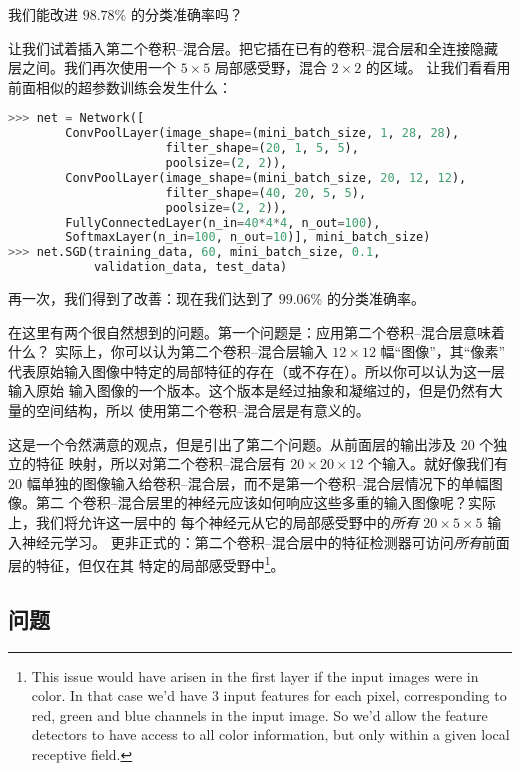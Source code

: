 我们能改进 $98.78$\% 的分类准确率吗？

让我们试着插入第二个卷积--混合层。把它插在已有的卷积--混合层和全连接隐藏
层之间。我们再次使用一个 $5 \times 5$ 局部感受野，混合 $2 \times 2$ 的区域。
让我们看看用前面相似的超参数训练会发生什么：
\begin{lstlisting}[language=Python]
>>> net = Network([
        ConvPoolLayer(image_shape=(mini_batch_size, 1, 28, 28), 
                      filter_shape=(20, 1, 5, 5), 
                      poolsize=(2, 2)),
        ConvPoolLayer(image_shape=(mini_batch_size, 20, 12, 12), 
                      filter_shape=(40, 20, 5, 5), 
                      poolsize=(2, 2)),
        FullyConnectedLayer(n_in=40*4*4, n_out=100),
        SoftmaxLayer(n_in=100, n_out=10)], mini_batch_size)
>>> net.SGD(training_data, 60, mini_batch_size, 0.1, 
            validation_data, test_data)        
\end{lstlisting}

再一次，我们得到了改善：现在我们达到了 $99.06$\% 的分类准确率。

在这里有两个很自然想到的问题。第一个问题是：应用第二个卷积--混合层意味着什么？
实际上，你可以认为第二个卷积--混合层输入 $12 \times 12$ 幅“图像”，其“像素”
代表原始输入图像中特定的局部特征的存在（或不存在）。所以你可以认为这一层输入原始
输入图像的一个版本。这个版本是经过抽象和凝缩过的，但是仍然有大量的空间结构，所以
使用第二个卷积--混合层是有意义的。

这是一个令然满意的观点，但是引出了第二个问题。从前面层的输出涉及 $20$ 个独立的特征
映射，所以对第二个卷积--混合层有 $20 \times 20 \times 12$ 个输入。就好像我们有
$20$ 幅单独的图像输入给卷积--混合层，而不是第一个卷积--混合层情况下的单幅图像。第二
个卷积--混合层里的神经元应该如何响应这些多重的输入图像呢？实际上，我们将允许这一层中的
每个神经元从它的局部感受野中的\emph{所有} $20 \times 5 \times 5$ 输入神经元学习。
更非正式的：第二个卷积--混合层中的特征检测器可访问\emph{所有}前面层的特征，但仅在其
特定的局部感受野中\footnote{This issue would have arisen in the first layer if the input images were in color. In that case we'd have 3 input features for each pixel, corresponding to red, green and blue channels in the input image. So we'd allow the feature detectors to have access to all color information, but only within a given local receptive field.}。

\subsection*{问题}


